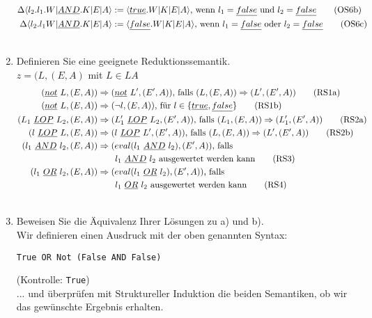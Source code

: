 \documentclass[ngerman,a4paper]{report}
\begin{document}
\begin{enumerate}
\begin{align}
\Delta\langle l_2.l_1.W|\underline{AND}.K|E|A\rangle &:= \langle \underline{true}.W|K|E|A\rangle\text{, wenn }l_1=\underline{false}\text{ und }l_2=\underline{false}\tag{OS6b}\\
\Delta\langle l_2.l_1W|\underline{AND}.K|E|A\rangle &:= \langle \underline{false}.W|K|E|A\rangle\text{, wenn }l_1=\underline{false}\text{ oder }l_2=\underline{false}\tag{OS6c}\\\notag
\end{align}
\item Definieren Sie eine geeignete Reduktionssemantik.\\
$z=(L, (E,A)$ mit $L \in LA$
\begin{align}
(\underline{not}\  L,(E,A)) &\Rightarrow (\underline{not}\  L',(E',A))\text{, falls }(L,(E,A)) \Rightarrow (L',(E',A))\tag{RS1a}\\
(\underline{not}\  L,(E,A)) &\Rightarrow (\neg l,(E,A))\text{, für }l\in\{\underline{true},\underline{false}\}\tag{RS1b}\\
(L_1\ \underline{LOP}\ L_2,(E,A)) &\Rightarrow (L_1'\ \underline{LOP}\ L_2,(E',A))\text{, falls }(L_1,(E,A)) \Rightarrow (L_1',(E',A))\tag{RS2a}\\
(l\ \underline{LOP}\ L,(E,A)) &\Rightarrow (l\ \underline{LOP}\ L',(E',A))\text{, falls }(L,(E,A)) \Rightarrow (L',(E',A))\tag{RS2b}\\
(l_1\ \underline{AND}\ l_2,(E,A)) &\Rightarrow (eval(l_1\ \underline{AND}\ l_2),(E',A))\text{, falls }\notag\\&\quad\quad l_1\ \underline{AND}\ l_2\text{ ausgewertet werden kann}\tag{RS3}\\
(l_1\ \underline{OR}\ l_2,(E,A)) &\Rightarrow (eval(l_1\ \underline{OR}\ l_2),(E',A))\text{, falls }\notag\\&\quad\quad l_1\ \underline{OR}\ l_2\text{ ausgewertet werden kann}\tag{RS4}\\ \notag
\end{align}
\item Beweisen Sie die Äquivalenz Ihrer Lösungen zu a) und b).\\
Wir definieren einen Ausdruck mit der oben genannten Syntax:
\begin{lstlisting}
True OR Not (False AND False)
\end{lstlisting}
(Kontrolle: \lstinline!True!)\\
... und überprüfen mit Struktureller Induktion die beiden Semantiken, ob wir das gewünschte Ergebnis erhalten.
\begin{enumerate}

\end{enumerate}
\end{enumerate}
\end{document}
